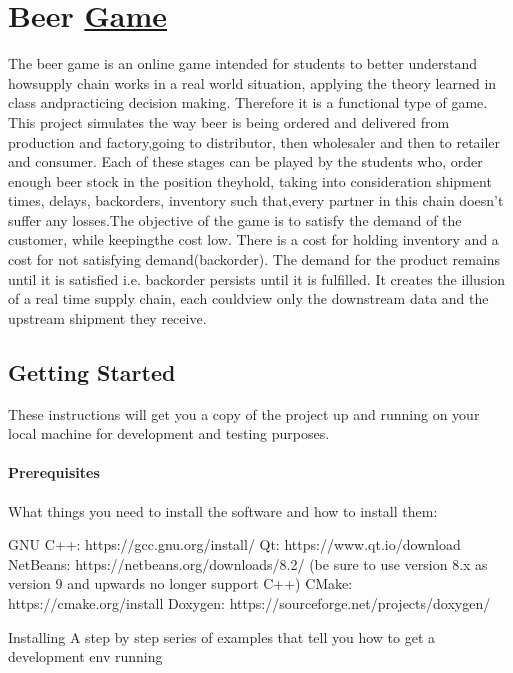 \section*{Beer \hyperlink{class_game}{Game}}

The beer game is an online game intended for students to better understand howsupply chain works in a real world situation, applying the theory learned in class andpracticing decision making. Therefore it is a functional type of game. This project simulates the way beer is being ordered and delivered from production and factory,going to distributor, then wholesaler and then to retailer and consumer. Each of these stages can be played by the students who, order enough beer stock in the position theyhold, taking into consideration shipment times, delays, backorders, inventory such that,every partner in this chain doesn’t suffer any losses.\+The objective of the game is to satisfy the demand of the customer, while keepingthe cost low. There is a cost for holding inventory and a cost for not satisfying demand(backorder). The demand for the product remains until it is satisfied i.\+e. backorder persists until it is fulfilled. It creates the illusion of a real time supply chain, each couldview only the downstream data and the upstream shipment they receive.

\subsection*{Getting Started}

These instructions will get you a copy of the project up and running on your local machine for development and testing purposes.

\paragraph*{Prerequisites}

What things you need to install the software and how to install them\+:


\begin{DoxyCode}
GNU C++: https://gcc.gnu.org/install/
Qt: https://www.qt.io/download
NetBeans: https://netbeans.org/downloads/8.2/ (be sure to use version 8.x as version 9 and upwards no
       longer support C++)
CMake: https://cmake.org/install
Doxygen: https://sourceforge.net/projects/doxygen/
\end{DoxyCode}
 Installing A step by step series of examples that tell you how to get a development env running

